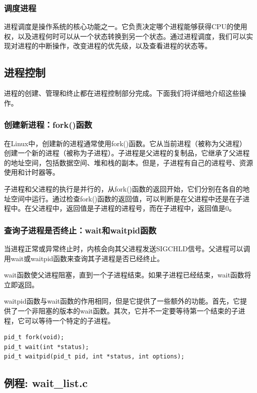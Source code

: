 \documentclass[12pt, a4paper, oneside]{ctexbook}
\numberwithin{figure}{section}
\begin{document}
\subsubsection{调度进程}
进程调度是操作系统的核心功能之一。它负责决定哪个进程能够获得CPU的使用权，以及进程何时可以从一个状态转换到另一个状态。通过进程调度，我们可以实现对进程的中断操作，改变进程的优先级，以及查看进程的状态等。

\subsection{进程控制}
进程的创建、管理和终止都在进程控制部分完成。下面我们将详细地介绍这些操作。

\subsubsection{创建新进程：fork()函数}
在Linux中，创建新的进程通常使用fork()函数。它从当前进程（被称为父进程）创建一个新的进程（被称为子进程）。子进程是父进程的复制品，它继承了父进程的地址空间，包括数据空间、堆和栈的副本。但是，子进程有自己的进程号、资源使用和计时器等。

子进程和父进程的执行是并行的，从fork()函数的返回开始，它们分别在各自的地址空间中运行。通过检查fork()函数的返回值，可以判断是在父进程中还是在子进程中。在父进程中，返回值是子进程的进程号，而在子进程中，返回值是0。

\subsubsection{查询子进程是否终止：wait和waitpid函数}
当进程正常或异常终止时，内核会向其父进程发送SIGCHLD信号。父进程可以调用wait或waitpid函数来查询其子进程是否已经终止。

wait函数使父进程阻塞，直到一个子进程结束。如果子进程已经结束，wait函数将立即返回。

waitpid函数与wait函数的作用相同，但是它提供了一些额外的功能。首先，它提供了一个非阻塞的版本的wait函数。其次，它并不一定要等待第一个结束的子进程，它可以等待一个特定的子进程。

\begin{verbatim}
pid_t fork(void);
pid_t wait(int *status);
pid_t waitpid(pid_t pid, int *status, int options);
\end{verbatim}


\subsection{例程: wait_list.c}
\end{document}
